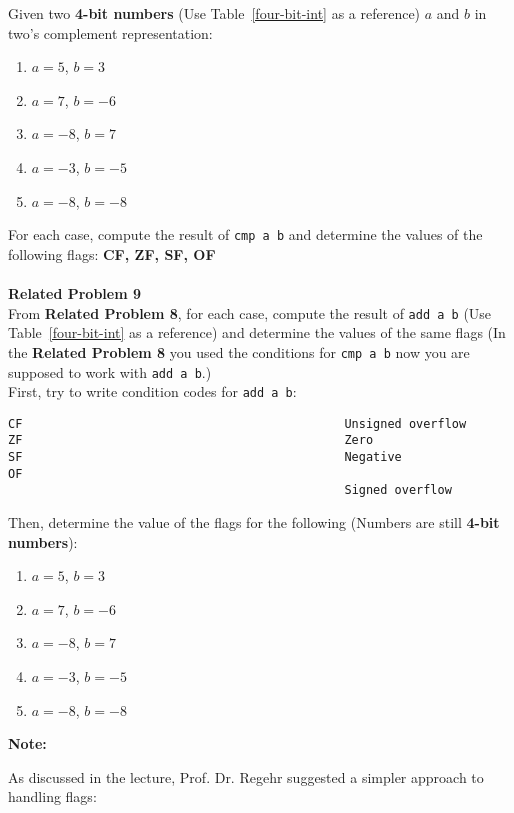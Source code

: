 \documentclass{article}
\begin{document}
 
Given two \textbf{4-bit numbers} (Use Table~\ref{four-bit-int} as a reference) $a$ and $b$ in two’s complement representation:

\begin{enumerate}
    \item $a = 5$, $b = 3$
    \item $a = 7$, $b = -6$
    \item $a = -8$, $b = 7$
    \item $a = -3$, $b = -5$
    \item $a = -8$, $b = -8$
\end{enumerate}

For each case, compute the result of \texttt{cmp a b} and determine the values of the following flags: \textbf{CF, ZF, SF, OF} \\
\\
\clearpage
\noindent\textbf{Related Problem 9}  \\
From \textbf{Related Problem 8}, for each case, compute the result of \texttt{add a b} (Use Table~\ref{four-bit-int} as a reference) and determine the values of the same flags (In the \textbf{Related Problem 8} you used the conditions for \texttt{cmp a b} now you are supposed to work with \texttt{add a b}.) \\ 
First, try to write condition codes for \texttt{add a b}: \\

\begin{Verbatim}[frame=single]
CF                                             Unsigned overflow
ZF                                             Zero
SF                                             Negative
OF   
                                               Signed overflow
\end{Verbatim}

Then, determine the value of the flags for the following (Numbers are still \textbf{4-bit numbers}): \\
\begin{enumerate}
    \item $a = 5$, $b = 3$
    \item $a = 7$, $b = -6$
    \item $a = -8$, $b = 7$
    \item $a = -3$, $b = -5$
    \item $a = -8$, $b = -8$
\end{enumerate}

\noindent\textbf{Note:}  

As discussed in the lecture, Prof. Dr. Regehr suggested a simpler approach to handling flags:  
\end{document}
